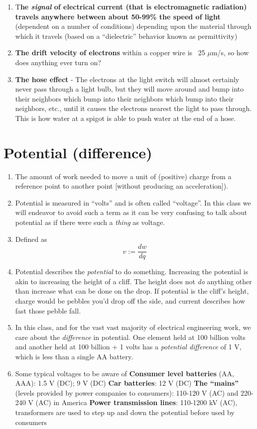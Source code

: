 \documentclass[11pt]{book}
\begin{document}
\begin{enumerate}
	\item T\textbf{he \textit{signal} of electrical current (that is electromagnetic radiation) travels anywhere between about 50-99\% the speed of light} (dependent on a number of conditions) depending upon the material through which it travels (based on a “dielectric” behavior known as permittivity)
	\item \textbf{The drift velocity of electrons} within a copper wire is ~25 $\mu$m/s, so how does anything ever turn on?
	\item \textbf{The hose effect} - The electrons at the light switch will almost certainly never pass through a light bulb, but they will move around and bump into their neighbors which bump into their neighbors which bump into their neighbors, etc., until it causes the electrons nearest the light to pass through. This is how water at a spigot is able to push water at the end of a hose.
\end{enumerate}



\section{Potential (difference)}
\begin{enumerate}
	\item The amount of work needed to move a unit of (positive) charge from a reference point to another point [without producing an acceleration]).
	\item Potential is measured in ``volts'' and is often called ``voltage''. In this class we will endeavor to avoid such a term as it can be very confusing to talk about potential as if there were such a \textit{thing} as voltage.
	\item Defined as 
	\begin{equation}
		v:= \frac{dw}{dq}
	\end{equation}
	\item Potential describes the \textit{potential} to do something. Increasing the potential is akin to increasing the height of a cliff. The height does not \textit{do} anything other than increase what can be done on the drop. If potential is the cliff's height, charge would be pebbles you'd drop off the side, and current describes how fast those pebble fall.
	\item In this class, and for the vast vast majority of electrical engineering work, we care about the \textit{difference} in potential. One element held at 100 billion volts and another held at 100 billion + 1 volts has a \textit{potential difference} of 1 V, which is less than a single AA battery.
	\item Some typical voltages to be aware of
	\subitem \textbf{Consumer level batteries} (AA, AAA): 1.5 V (DC); 9 V (DC) 
	\subitem \textbf{Car batteries}: 12 V (DC)
	\subitem \textbf{The ``mains''} (levels provided by power companies to consumers): 110-120 V (AC) and 220-240 V (AC) in America
	\subitem \textbf{Power transmission lines}: 110-1200 kV (AC), transformers are used to step up and down the potential before used by consumers
\end{enumerate}
\end{document}
